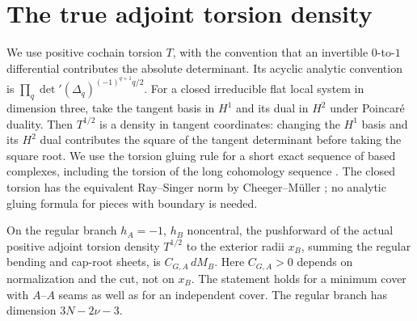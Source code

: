 \section{The true adjoint torsion density}\label{sec:torsion}
We use positive cochain torsion \(T\), with the convention that an invertible \(0\)-to-\(1\) differential contributes the absolute determinant. Its acyclic analytic convention is \(\prod_q\det'(\Delta_q)^{(-1)^{q+1}q/2}\). For a closed irreducible flat local system in dimension three, take the tangent basis in \(H^1\) and its dual in \(H^2\) under Poincar\'e duality. Then \(T^{1/2}\) is a density in tangent coordinates: changing the \(H^1\) basis and its \(H^2\) dual contributes the square of the tangent determinant before taking the square root. We use the torsion gluing rule for a short exact sequence of based complexes, including the torsion of the long cohomology sequence \cite{Milnor}. The closed torsion has the equivalent Ray--Singer norm by Cheeger--M\"uller \cite{CM1,CM2}; no analytic gluing formula for pieces with boundary is needed.

\begin{theorem}\label{thm:torsion}
On the regular branch \(h_A=-1\), \(h_B\) noncentral, the pushforward of the actual positive adjoint torsion density \(T^{1/2}\) to the exterior radii \(x_B\), summing the regular bending and cap-root sheets, is \(C_{G,A}\,dM_B\). Here \(C_{G,A}>0\) depends on normalization and the cut, not on \(x_B\). The statement holds for a minimum cover with \(A\)--\(A\) seams as well as for an independent cover. The regular branch has dimension \(3N-2\nu-3\).
\end{theorem}


